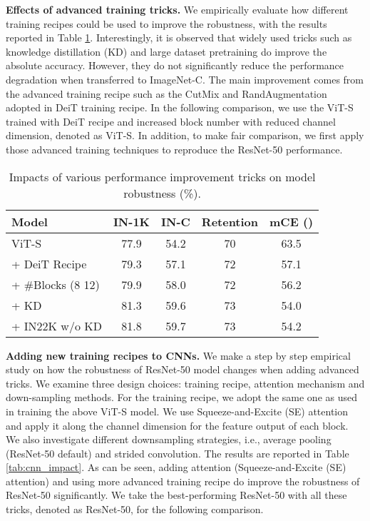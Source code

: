 \documentclass[nohyperref]{article}
\theoremstyle{plain}
\theoremstyle{definition}
\theoremstyle{remark}
\begin{document}
\textbf{Effects of advanced training tricks.}
We empirically evaluate how different training recipes could be used to improve the robustness, with the results reported in Table \ref{tab:robustness_impact_vit}. Interestingly, it is observed that widely used tricks such as knowledge distillation (KD) and large dataset pretraining do improve the absolute accuracy. However, they do not significantly reduce the performance degradation when transferred to ImageNet-C. The main improvement comes from the advanced training recipe such as the CutMix and  RandAugmentation adopted in DeiT training recipe. In the following comparison, we use the ViT-S trained with DeiT recipe and increased block number with reduced channel dimension, denoted as ViT-S. In addition, to make   fair comparison, we first apply those advanced training techniques to reproduce the ResNet-50 performance.
\vspace{-3mm}
\begin{table}[h]
    \small
    \caption{Impacts of various performance improvement tricks on model robustness (\%).}
    \label{tab:robustness_impact_vit}
    \vspace{2mm}
    \centering
    \setlength{\tabcolsep}{4pt}
    \begin{tabular}{l|cccc}  Model      & IN-1K      & IN-C   &  Retention &mCE () \\
    \midrule
    ViT-S &  77.9 & 54.2 &  70      &  63.5 \\  
    \quad + DeiT Recipe &  79.3  & 57.1 &   72    & 57.1 \\ 
    \quad +  \#Blocks (8 12) & 79.9  & 58.0 & 72 &  56.2 \\
    \quad + KD & 81.3 & 59.6 &      73 & 54.0 \\ 
    \quad + IN22K w/o KD &  81.8 & 59.7 &  73 & 54.2 \\
    \end{tabular}
\end{table}

\vspace{-5mm}
\textbf{Adding new training recipes to CNNs.}
We make a step by step empirical study on how the robustness of ResNet-50 model changes when adding advanced tricks. We examine three design choices: training recipe, attention mechanism and down-sampling methods.
For the training recipe, we adopt the same one as used in training the above ViT-S model. We use Squeeze-and-Excite (SE) attention \cite{hu2018squeeze} and apply it along the channel dimension for the feature output of each block. We also investigate different downsampling strategies, i.e., average pooling (ResNet-50 default) and strided convolution. The results are reported in Table \ref{tab:cnn_impact}. As can be seen, adding attention (Squeeze-and-Excite (SE) attention) and using more advanced training recipe do improve the robustness of ResNet-50 significantly. We take the best-performing ResNet-50 with all these tricks, denoted as ResNet-50, for the following comparison.
\end{document}
